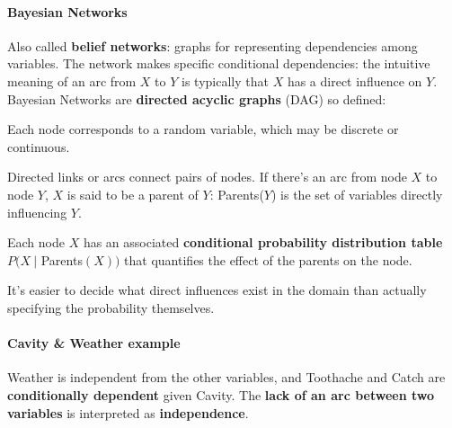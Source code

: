\documentclass[10pt]{report}
\begin{document}
\paragraph{Bayesian Networks} Also called \textbf{belief networks}: graphs for representing dependencies among variables. The network makes specific conditional dependencies: the intuitive meaning of an arc from $X$ to $Y$ is typically that $X$ has a direct influence on $Y$.\\
Bayesian Networks are \textbf{directed acyclic graphs} (DAG) so defined:
\begin{list}{}{}
	\item Each node corresponds to a random variable, which may be discrete or continuous.
	\item Directed links or arcs connect pairs of nodes. If there's an arc from node $X$ to node $Y$, $X$ is said to be a parent of $Y$: Parents($Y$) is the set of variables directly influencing $Y$.
	\item Each node $X$ has an associated \textbf{conditional probability distribution table} $P(X\:|$ Parents$(X))$ that quantifies the effect of the parents on the node.
\end{list}
It's easier to decide what direct influences exist in the domain than actually specifying the probability themselves.
\paragraph{Cavity \& Weather example}
\begin{center}
\end{center}
Weather is independent from the other variables, and Toothache and Catch are \textbf{conditionally dependent} given Cavity. The \textbf{lack of an arc between two variables} is interpreted as \textbf{independence}.
\end{document}
